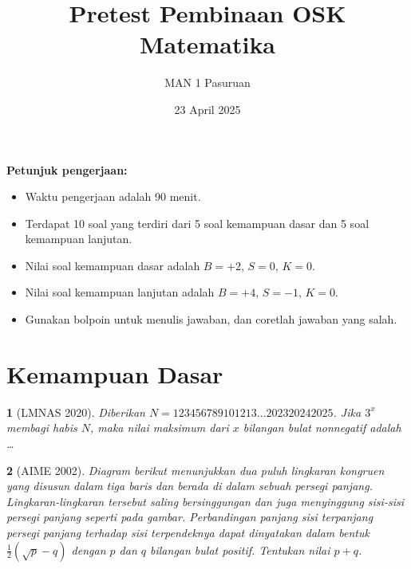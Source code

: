 \documentclass[11pt,a4paper,DIV=12]{scrartcl}
\theoremstyle{justnumber}
\newtheorem{problem}{}
\begin{document}
\title{Pretest Pembinaan OSK Matematika}
\author{MAN 1 Pasuruan}
\date{23 April 2025}
\maketitle
\noindent\textbf{Petunjuk pengerjaan:}
\begin{itemize}
  \item Waktu pengerjaan adalah 90 menit.
  \item Terdapat 10 soal yang terdiri dari 5 soal kemampuan dasar dan 5 soal kemampuan lanjutan.
  \item Nilai soal kemampuan dasar adalah {\color{green!70!black}$B=+2$}, {\color{red}$S=0$}, $K=0$.
  \item Nilai soal kemampuan lanjutan adalah {\color{green!70!black}$B=+4$}, {\color{red}$S=-1$}, $K=0$.
  \item Gunakan bolpoin untuk menulis jawaban, dan coretlah jawaban yang salah.
\end{itemize}

\section*{Kemampuan Dasar}
\begin{problem}[LMNAS 2020]
  Diberikan $N=123456789101213...202320242025$. Jika $3^x$ membagi habis $N$, maka nilai maksimum dari $x$ bilangan bulat nonnegatif adalah \dots
\end{problem}

\begin{problem}[AIME 2002]

  \noindent
  Diagram berikut menunjukkan dua puluh lingkaran kongruen yang disusun dalam tiga baris dan berada di dalam sebuah persegi panjang. Lingkaran-lingkaran tersebut saling bersinggungan dan juga menyinggung sisi-sisi persegi panjang seperti pada gambar. Perbandingan panjang sisi terpanjang persegi panjang terhadap sisi terpendeknya dapat dinyatakan dalam bentuk
  $
    \frac{1}{2}(\sqrt{p} - q)
  $
  dengan $p$ dan $q$ bilangan bulat positif. Tentukan nilai $p + q$.

  \begin{center}
  \end{center}
\end{problem}
\end{document}
